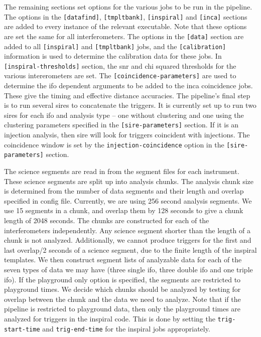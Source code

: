 \begin{entry}
The remaining sections set options for the various jobs to be run in the
pipeline.  The options in the \verb$[datafind]$, \verb$[tmpltbank]$,
\verb$[inspiral]$ and \verb$[inca]$ sections are added to every instance of
the relevant executable.  Note that these options are set the same for all
interferometers.  The options in the \verb$[data]$ section are added to all
\verb$[inspiral]$ and \verb$[tmpltbank]$ jobs, and the \verb$[calibration]$
information is used to determine the calibration data for these jobs.  In
\verb$[inspiral-thresholds]$ section, the snr and chi squared thresholds for
the various intererometers are set.  The \verb$[coincidence-parameters]$ are
used to determine the ifo dependent arguments to be added to the inca
coincidence jobs.  These give the timing and effective distance accuracies.
The pipeline's final step is to run several sires to concatenate the triggers.
It is currently set up to run two sires for each ifo and analysis type -- one
without clustering and one using the clustering parameters specified in the
\verb$[sire-parameters]$ section.  If it is an injection analysis, then sire
will look for triggers coincident with injections.  The coincidence window is
set by the \verb$injection-coincidence$ option in the \verb$[sire-parameters]$
section.

The science segments are read in from the segment files for each instrument.
These science segments are split up into analysis chunks.  The analysis chunk
size is determined from the number of data segments and their length and
overlap specified in config file. Currently, we are using 256 second analysis
segments.  We use 15 segments in a chunk, and overlap them by 128 seconds to
give a chunk length of 2048 seconds.  The chunks are constructed for each of
the interferometers independently.  Any science segment shorter than the
length of a chunk is not analyzed.  Additionally, we cannot produce triggers
for the first and last overlap/2 seconds of a science segment, due to the
finite length of the inspiral templates.  We then construct segment lists of
analyzable data for each of the seven types of data we may have (three single
ifo, three double ifo and one triple ifo).  If the playground only option is
specified, the segments are restricted to playground times.  We decide which
chunks should be analyzed by testing for overlap between the chunk and the
data we need to analyze.  Note that if the pipeline is restricted to
playground data, then only the playground times are analyzed for triggers in
the inspiral code.  This is done by setting the \verb$trig-start-time$ and
\verb$trig-end-time$ for the inspiral jobs appropriately.


\end{entry}
